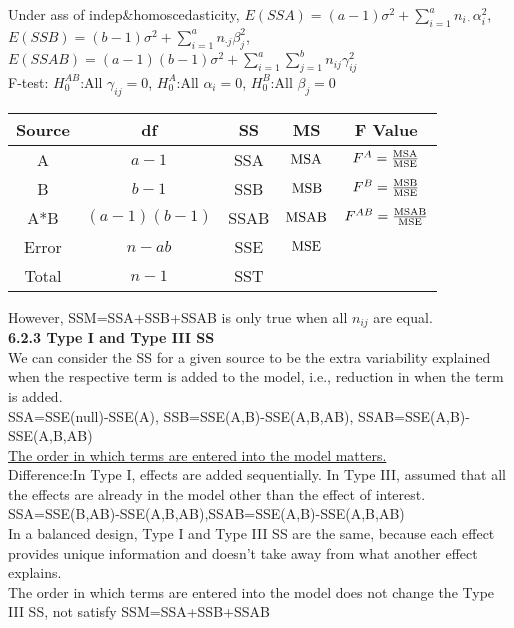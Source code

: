 \documentclass[10pt,a4paper,landscape]{article}
\begin{document}
\begin{multicols}{3}
{   Under ass of indep\&homoscedasticity, $E(SSA)=(a-1)\sigma^2+\sum_{i=1}^a n_{i\cdot}\alpha_i^2$, $E(SSB)=(b-1)\sigma^2+\sum_{i=1}^a n_{\cdot j}\beta_j^2$, $E(SSAB)=(a-1)(b-1)\sigma^2+\sum_{i=1}^a\sum_{j=1}^b n_{ij}\gamma_{ij}^2$\\
   F-test: $H_0^{AB}$:All $\gamma_{ij}=0$, $H_0^A$:All $\alpha_i=0$, $H_0^B$:All $\beta_j=0$
   \begin{table}[H]
	\scriptsize
	\begin{tabular}{c|cccc}
		\hline
		Source & df           & SS   & MS           & F Value                           \\
		\hline
		A      & $a-1$        & SSA  & ${\rm MSA}$  & $F^A=\frac{\rm MSA}{\rm MSE}$     \\
		B      & $b-1$        & SSB  & ${\rm MSB}$  & $F^B=\frac{\rm MSB}{\rm MSE}$     \\
		A*B    & $(a-1)(b-1)$ & SSAB & ${\rm MSAB}$ & $F^{AB}=\frac{\rm MSAB}{\rm MSE}$ \\
		Error  & $n-ab$       & SSE  & ${\rm MSE}$  &                                   \\
		Total  & $n-1$        & SST  &              &                                   \\
	\end{tabular}
\end{table}
   However, SSM=SSA+SSB+SSAB is only true when all $n_{ij}$ are equal.\\
   \textbf{6.2.3 Type I and Type III SS}\\
   We can consider the SS for a given source to be the extra variability explained when the respective term is added to  the model, i.e., reduction in when the term is added.\\
   SSA=SSE(null)-SSE(A), SSB=SSE(A,B)-SSE(A,B,AB), SSAB=SSE(A,B)-SSE(A,B,AB)\\
   \underline{The order in which terms are entered into the model matters.}\\
   
   Difference:In Type I, effects are added sequentially. In Type III, assumed that all the effects are already in the model other than the effect of interest.\\
   SSA=SSE(B,AB)-SSE(A,B,AB),SSAB=SSE(A,B)-SSE(A,B,AB)\\
   In a balanced design, Type I and Type III SS are the same, because each effect provides unique
   information and doesn’t take away from what another effect explains.\\
   The order in which terms are entered into the model does not change the Type III SS, not satisfy SSM=SSA+SSB+SSAB
   
}
\end{multicols}
\end{document}
